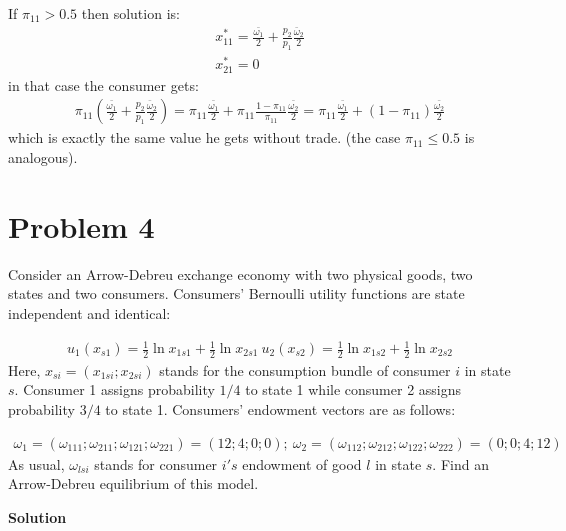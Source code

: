 \documentclass[a4paper]{article}
\begin{document}
\begin{enumerate}[(a)]
\begin{align*}
	\end{align*}
	If $\pi_{11} > 0.5$ then solution is:
	\begin{align*}
	x_{11}^* = \frac{\bar{\omega_1}}{2} + \frac{p_2}{p_1}\frac{\bar{\omega}_2}{2}\\
	x_{21}^* = 0
	\end{align*}
	in that case the consumer gets:
	\begin{align*}
	\pi_{11} \left(\frac{\bar{\omega_1}}{2} + \frac{p_2}{p_1}\frac{\bar{\omega}_2}{2}\right) = \pi_{11} \frac{\bar{\omega_1}}{2} + \pi_{11}\frac{1 - \pi_{11}}{\pi_{11}} \frac{\bar{\omega_2}}{2} = \pi_{11} \frac{\bar{\omega_1}}{2} + (1 - \pi_{11})\frac{\bar{\omega_2}}{2}
	\end{align*}
	which is exactly the same value he gets without trade. (the case $\pi_{11} \le 0.5$ is analogous).
\end{enumerate}

\section*{Problem 4}
Consider an Arrow-Debreu exchange economy with two physical goods, two states and
two consumers. Consumers' Bernoulli utility functions are state independent and identical:

\begin{align*}
u_1(x_{s1}) = \frac{1}{2} \ln x_{1s1} + \frac{1}{2}\ln x_{2s1}\ u_2(x_{s2}) = \frac{1}{2} \ln x_{1s2} + \frac{1}{2}\ln x_{2s2}
\end{align*}
Here, $x_{si} = (x_{1si}; x_{2si})$ stands for the consumption bundle of consumer $i$ in state $s$. Consumer
1 assigns probability $1/4$ to state 1 while consumer 2 assigns probability $3/4$ to state 1.
Consumers' endowment vectors are as follows:

\begin{align*}
\omega_1 = (\omega_{111}; \omega_{211}; \omega_{121}; \omega_{221}) = (12; 4; 0; 0);\  \omega_{2} = (\omega_{112}; \omega_{212}; \omega_{122}; \omega_{222}) = (0; 0; 4; 12)
\end{align*}
As usual, $\omega_{lsi}$ stands for consumer $i's$ endowment of good $l$ in state $s$. Find an Arrow-Debreu
equilibrium of this model.


\textbf{Solution}
\end{document}
